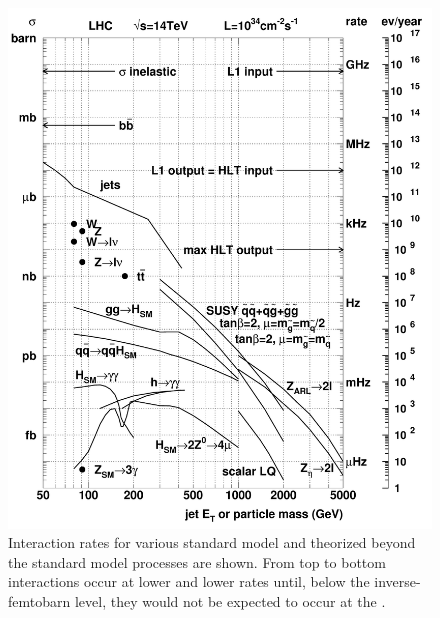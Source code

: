 \begin{figure}[!btp]
    \centering
    \includegraphics[width=\textwidth]{figures/lhc_rates.pdf}
    \caption[Interaction rates at the \LHC.]
       {Interaction rates for various standard model and theorized beyond the standard model processes are shown.  From top to bottom interactions occur at lower and lower rates until, below the inverse-femtobarn level, they would not be expected to occur at the \LHC \cite{lhc_rates}.}
    \label{fig:lhc_rates}
\end{figure}



